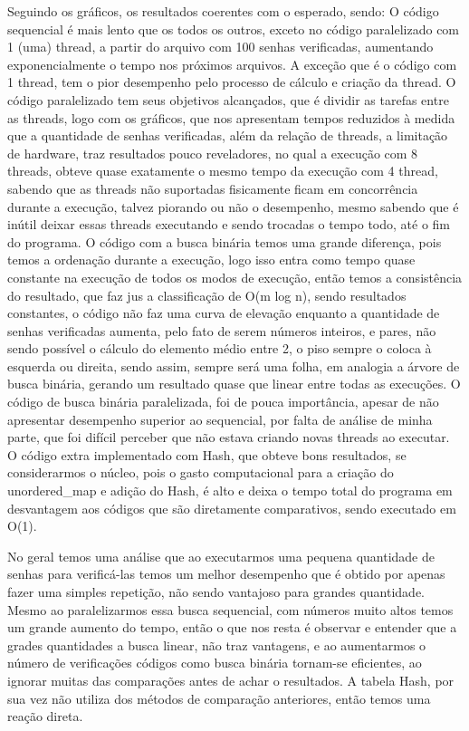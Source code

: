 \documentclass[10pt,journal,compsoc]{IEEEtran}
\begin{document}
Seguindo os gráficos, os resultados coerentes com o esperado, sendo:
O código sequencial é mais lento que os todos os outros, exceto no código paralelizado com 1 (uma) thread, a partir do arquivo com 100 senhas verificadas, aumentando exponencialmente o tempo nos próximos arquivos. A exceção que é o código com 1 thread, tem o pior desempenho pelo processo de cálculo e criação da thread.
O código paralelizado tem seus objetivos alcançados, que é dividir as tarefas entre as threads, logo com os gráficos, que nos apresentam tempos reduzidos à medida que a quantidade de senhas verificadas, além da relação de threads, a limitação de hardware, traz resultados pouco reveladores, no qual a execução com 8 threads, obteve quase exatamente o mesmo tempo da execução com 4 thread, sabendo que as threads não suportadas fisicamente ficam em concorrência durante a execução, talvez piorando ou não o desempenho, mesmo sabendo que é inútil deixar essas threads executando e sendo trocadas o tempo todo, até o fim do programa.
O código com a busca binária temos uma grande diferença, pois temos a ordenação durante a execução, logo isso entra como tempo quase constante na execução de todos os modos de execução, então temos a consistência do resultado, que faz jus a classificação de O(m log n), sendo resultados constantes, o código não faz uma curva de elevação enquanto a quantidade de senhas verificadas aumenta, pelo fato de serem números inteiros, e pares, não sendo possível o cálculo do elemento médio entre 2, o piso sempre o coloca à esquerda ou direita, sendo assim, sempre será uma folha, em analogia a árvore de busca binária, gerando um resultado quase que linear entre todas as execuções.
O código de busca binária paralelizada, foi de pouca importância, apesar de não apresentar desempenho superior ao sequencial, por falta de análise de minha parte, que foi difícil perceber que não estava criando novas threads ao executar.
O código extra implementado com Hash, que obteve bons resultados, se considerarmos o núcleo, pois o gasto computacional para a criação do unordered\_map e adição do Hash, é alto e deixa o tempo total do programa em desvantagem aos códigos que são diretamente comparativos, sendo executado em O(1).

No geral temos uma análise que ao executarmos uma pequena quantidade de senhas para verificá-las temos um melhor desempenho que é obtido por apenas fazer uma simples repetição, não sendo vantajoso para grandes quantidade. Mesmo ao paralelizarmos essa busca sequencial, com números muito altos temos um grande aumento do tempo, então o que nos resta é observar e entender que a grades quantidades a busca linear, não traz vantagens, e ao aumentarmos o número de verificações códigos como busca binária tornam-se eficientes, ao ignorar muitas das comparações antes de achar o resultados. A tabela Hash, por sua vez não utiliza dos métodos de comparação anteriores, então temos uma reação direta.
	
\end{document}
